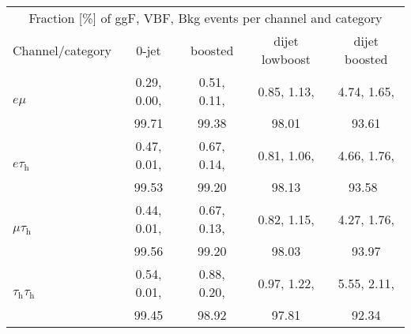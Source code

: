 \begin{tabular}{lcccc}
\toprule
\multicolumn{5}{c}{Fraction [\%] of ggF, VBF, Bkg events per channel and category}                         \\
 Channel/category &                 0-jet &               boosted &        dijet lowboost &         dijet boosted \\
\midrule
\multirow{2}{*}{$e\mu$   }                        &  0.29, 0.00,  &  0.51, 0.11,  &  0.85, 1.13,  &  4.74, 1.65, \\
                                                  &      99.71      &        99.38    &     98.01      &       93.61      \\   
\multirow{2}{*}{$e\tau_\text{h}$  }             &  0.47, 0.01,  &  0.67, 0.14,  &  0.81, 1.06,  &  4.66, 1.76, \\
                                                  &     99.53       &        99.20   &       98.13     &        93.58\     \\                
\multirow{2}{*}{$\mu\tau_\text{h}$ }            &  0.44, 0.01,  &  0.67, 0.13,  &  0.82, 1.15,  &  4.27, 1.76, \\
                                                  &     99.56       &        99.20   &      98.03      &        93.97     \\   
\multirow{2}{*}{$\tau_\text{h}\tau_\text{h}$} &  0.54, 0.01,  &  0.88, 0.20,  &  0.97, 1.22,  &  5.55, 2.11,  \\
                                                  &       99.45     &       98.92     &      97.81      &         92.34       \\   
\bottomrule
\end{tabular}
